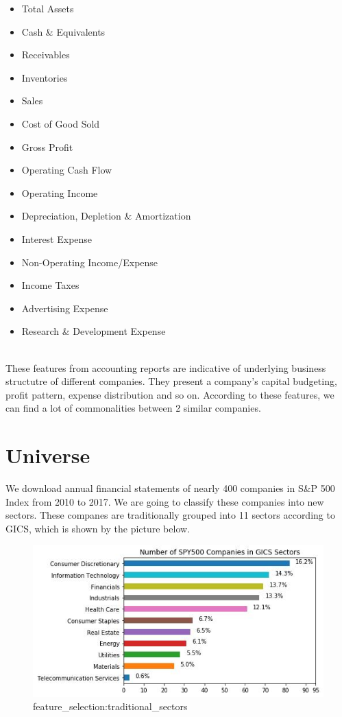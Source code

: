 \documentclass[../main.tex]{subfiles}
\begin{document}
\begin{itemize}
    \item Total Assets
    \item Cash \& Equivalents
    \item Receivables
    \item Inventories
    \item Sales
    \item Cost of Good Sold
    \item Gross Profit
    \item Operating Cash Flow
    \item Operating Income
	\item Depreciation, Depletion \& Amortization
	\item Interest Expense
	\item Non-Operating Income/Expense
	\item Income Taxes
	\item Advertising Expense
	\item Research \& Development Expense
	\\~\\
\end{itemize}

These features from accounting reports are indicative of underlying business structutre of different companies. They present a company's capital budgeting, profit pattern, expense distribution and so on. According to these features, we can find a lot of commonalities between 2 similar companies.

\section{Universe}

We download annual financial statements of nearly 400 companies in S\&P 500 Index from 2010 to 2017. We are going to classify these companies into new sectors. These companes are traditionally grouped into 11 sectors according to GICS, which is shown by the picture below.

\begin{figure}[H]
    \includegraphics{images/traditional_sectors.jpeg}
    \caption{feature_selection:traditional_sectors}
    \label{fig:feature_selection:traditional_sectors}
\end{figure}
\end{document}
